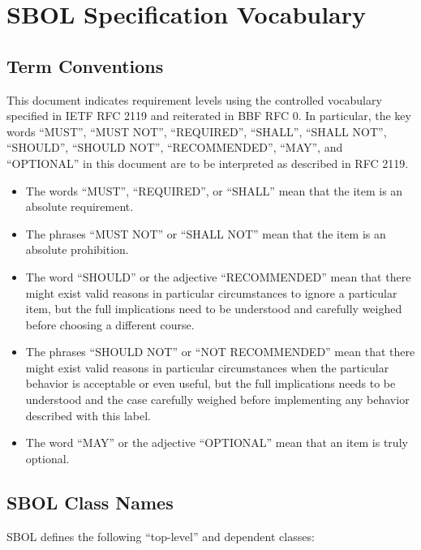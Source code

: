 \section{SBOL Specification Vocabulary}

\subsection{Term Conventions}

This document indicates requirement levels using the controlled vocabulary specified in IETF RFC 2119 and reiterated in BBF RFC 0.
In particular, the key words ``MUST'', ``MUST NOT'', ``REQUIRED'', ``SHALL'', ``SHALL NOT'', ``SHOULD'', ``SHOULD NOT'', ``RECOMMENDED'', ``MAY'', and ``OPTIONAL'' in this document are to be interpreted as described in RFC 2119.

\begin{itemize}
\item The words ``MUST'', ``REQUIRED'', or ``SHALL'' mean that the item is an absolute requirement.
\item The phrases ``MUST NOT'' or ``SHALL NOT'' mean that the item is an absolute prohibition.
\item The word ``SHOULD'' or the adjective ``RECOMMENDED'' mean that there might exist valid reasons in particular circumstances to ignore a particular item, but the full implications need to be understood and carefully weighed before choosing a different course.
\item The phrases ``SHOULD NOT'' or ``NOT RECOMMENDED'' mean that there might exist valid reasons in particular circumstances when the particular behavior is acceptable or even useful, but the full implications needs to be understood and the case carefully weighed before implementing any behavior described with this label.
\item The word ``MAY'' or the adjective ``OPTIONAL'' mean that an item is truly optional.
\end{itemize}

\subsection{SBOL Class Names}

SBOL defines the following ``top-level'' and dependent classes:

